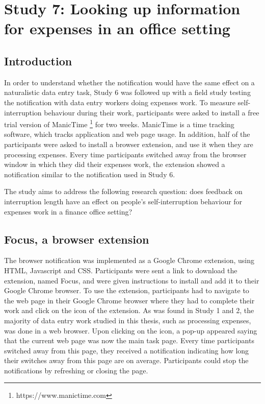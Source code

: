\section{Study 7: Looking up information for expenses in an office setting}

\subsection{Introduction}

In order to understand whether the notification would have the same effect on a naturalistic data entry task, Study 6 was followed up with a field study testing the notification with data entry workers doing expenses work. To measure self-interruption behaviour during their work, participants were asked to install a free trial version of ManicTime \footnote{https://www.manictime.com} for two weeks. ManicTime is a time tracking software, which tracks application and web page usage. In addition, half of the participants were asked to install a browser extension, and use it when they are processing expenses.  Every time participants switched away from the browser window in which they did their expenses work, the extension showed a notification similar to the notification used in Study 6.

The study aims to address the following research question: does feedback on interruption length have an effect on people's self-interruption behaviour for expenses work in a finance office setting? 

\subsection{Focus, a browser extension}
The browser notification was implemented as a Google Chrome extension, using HTML, Javascript and CSS. Participants were sent a link to download the extension, named Focus, and were given instructions to install and add it to their Google Chrome browser. To use the extension, participants had to navigate to the web page in their Google Chrome browser where they had to complete their work and click on the icon of the extension. As was found in Study 1 and 2, the majority of data entry work studied in this thesis, such as processing expenses, was done in a web browser. Upon clicking on the icon, a pop-up appeared saying that the current web page was now the main task page. Every time participants switched away from this page, they received a notification indicating how long their switches away from this page are on average. Participants could stop the notifications by refreshing or closing the page. 

